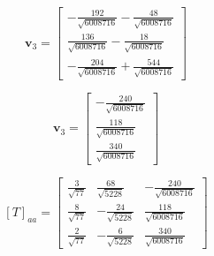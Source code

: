 \[ \mathbf{v}_3 = \begin{bmatrix} -\frac{192}{\sqrt{6008716}} - \frac{48}{\sqrt{6008716}} \\ \frac{136}{\sqrt{6008716}} - \frac{18}{\sqrt{6008716}} \\ -\frac{204}{\sqrt{6008716}} + \frac{544}{\sqrt{6008716}} \end{bmatrix} \]

\[ \mathbf{v}_3 = \begin{bmatrix} -\frac{240}{\sqrt{6008716}} \\ \frac{118}{\sqrt{6008716}} \\ \frac{340}{\sqrt{6008716}} \end{bmatrix} \]


\[ [T]_{aa} = \begin{bmatrix} \frac{3}{\sqrt{77}} & \frac{68}{\sqrt{5228}} & -\frac{240}{\sqrt{6008716}} \\ \frac{8}{\sqrt{77}} & -\frac{24}{\sqrt{5228}} & \frac{118}{\sqrt{6008716}} \\ \frac{2}{\sqrt{77}} & -\frac{6}{\sqrt{5228}} & \frac{340}{\sqrt{6008716}} \end{bmatrix} \]  
